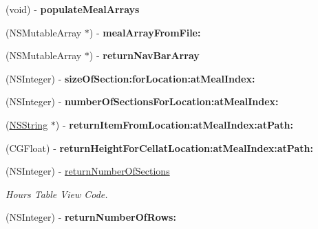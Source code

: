 \begin{DoxyCompactItemize}
\item 
\hypertarget{interface_schedule_decider_a1305a00f160b23e0d6c4595a99596342}{
(void) -\/ {\bfseries populateMealArrays}}
\label{interface_schedule_decider_a1305a00f160b23e0d6c4595a99596342}

\item 
\hypertarget{interface_schedule_decider_a4343c3616722ee381cc2569cdde65dba}{
(NSMutableArray $\ast$) -\/ {\bfseries mealArrayFromFile:}}
\label{interface_schedule_decider_a4343c3616722ee381cc2569cdde65dba}

\item 
\hypertarget{interface_schedule_decider_a9d387e624ee318bc6eee3f7784c8a8fe}{
(NSMutableArray $\ast$) -\/ {\bfseries returnNavBarArray}}
\label{interface_schedule_decider_a9d387e624ee318bc6eee3f7784c8a8fe}

\item 
\hypertarget{interface_schedule_decider_aa47871a064950c7f27ae0c15d4b2b334}{
(NSInteger) -\/ {\bfseries sizeOfSection:forLocation:atMealIndex:}}
\label{interface_schedule_decider_aa47871a064950c7f27ae0c15d4b2b334}

\item 
\hypertarget{interface_schedule_decider_a1d74d777c667b2c7d471d8254e13b1de}{
(NSInteger) -\/ {\bfseries numberOfSectionsForLocation:atMealIndex:}}
\label{interface_schedule_decider_a1d74d777c667b2c7d471d8254e13b1de}

\item 
\hypertarget{interface_schedule_decider_abb7a72e59890dca048f73003145190ac}{
(\hyperlink{class_n_s_string}{NSString} $\ast$) -\/ {\bfseries returnItemFromLocation:atMealIndex:atPath:}}
\label{interface_schedule_decider_abb7a72e59890dca048f73003145190ac}

\item 
\hypertarget{interface_schedule_decider_a5ed03feff58491193bb6c2ac1dd0cf65}{
(CGFloat) -\/ {\bfseries returnHeightForCellatLocation:atMealIndex:atPath:}}
\label{interface_schedule_decider_a5ed03feff58491193bb6c2ac1dd0cf65}

\item 
\hypertarget{interface_schedule_decider_abe6b2d82f0abeae5dbed595f0903e61a}{
(NSInteger) -\/ \hyperlink{interface_schedule_decider_abe6b2d82f0abeae5dbed595f0903e61a}{returnNumberOfSections}}
\label{interface_schedule_decider_abe6b2d82f0abeae5dbed595f0903e61a}

\begin{DoxyCompactList}\small\item\em Hours Table View Code. \item\end{DoxyCompactList}\item 
\hypertarget{interface_schedule_decider_a7f8040c5c36c3367f63f55a75a064b30}{
(NSInteger) -\/ {\bfseries returnNumberOfRows:}}
\label{interface_schedule_decider_a7f8040c5c36c3367f63f55a75a064b30}


\end{DoxyCompactItemize}
